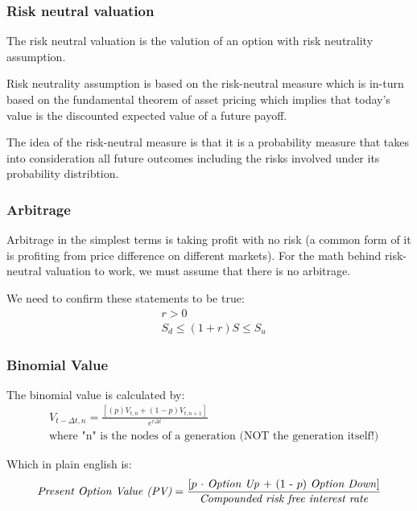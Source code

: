 \documentclass[12pt, letterpaper]{article}
\begin{document}
\subsubsection*{Risk neutral valuation}
The risk neutral valuation is the valution of an option with risk neutrality assumption.

Risk neutrality assumption is based on the risk-neutral measure which is in-turn based on the fundamental theorem of asset pricing which implies that today's value is the discounted expected value of a future payoff.

The idea of the risk-neutral measure is that it is a probability measure that takes into consideration all future outcomes including the risks involved under its probability distribtion.


\subsubsection*{Arbitrage}
Arbitrage in the simplest terms is taking profit with no risk (a common form of it is profiting from price difference on different markets).
For the math behind risk-neutral valuation to work, we must assume that there is no arbitrage.

We need to confirm these statements to be true:
\begin{align*}
  & {r > 0} \\
  & S_d \leq (1+r)S \leq S_u
\end{align*}


\subsubsection*{Binomial Value}
The binomial value is calculated by:
\begin{align*}
  & V_{t-\Delta t, n} = \frac{[(p)V_{t,n} + (1-p)V_{t,n+1}]}{e^{r\Delta t}}
  \\
  & \textrm{where "n" is the nodes of a generation (NOT the generation itself!)}
\end{align*}


Which in plain english is:
\begin{equation*}
  \textrm{\textit{Present Option Value (PV)}} = \frac{\textrm{[${p}$ ${\cdot}$ \textit{Option Up} + (1 - ${p}$) \textit{Option Down}]}}{\textrm{\textit{Compounded risk free interest rate}}}
\end{equation*}
\end{document}
